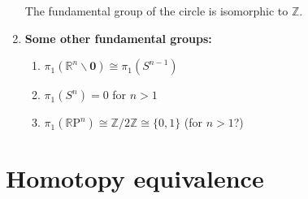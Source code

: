 \documentclass[letterpaper, 12pt]{book}
\newcommand{\RR}{\mathbb{R}}
\newcommand{\ZZ}{\mathbb{Z}}
\begin{document}
\begin{enumerate}[resume]
        The fundamental group of the circle is isomorphic to $\ZZ$.

    \item \textbf{Some other fundamental groups:}
        \begin{enumerate}
        \item $\pi_1(\RR^n \smallsetminus \mathbf{0}) \cong \pi_1(S^{n-1})$
        \item $\pi_1(S^n) = 0$ for $n > 1$
        \item $\pi_1(\RR\mathrm{P}^n) \cong \ZZ/2\ZZ \cong \{0,1\}$ (for $n > 1$?) %
        \end{enumerate}
    \end{enumerate}

\chapter{Homotopy equivalence}
\end{document}
